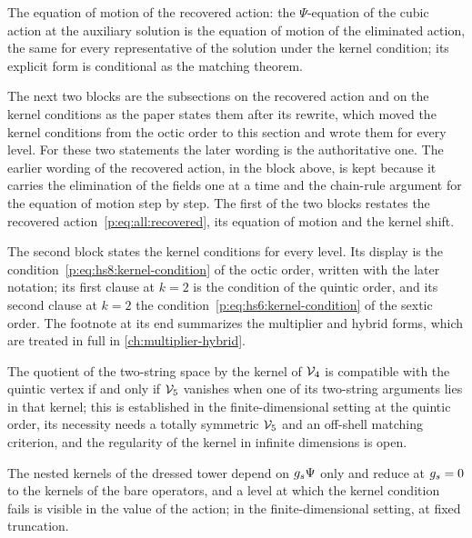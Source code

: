 \noindent{} The equation of motion of the recovered action: the $\Psi$-equation of the cubic action at the auxiliary solution is the equation of motion of the eliminated action, the same for every representative of the solution under the kernel condition; its explicit form is conditional as the matching theorem.



\medskip
The next two blocks are the subsections on the recovered action and on the kernel conditions as the paper states them after its rewrite, which moved the kernel conditions from the octic order to this section and wrote them for every level.
For these two statements the later wording is the authoritative one.
The earlier wording of the recovered action, in the block above, is kept because it carries the elimination of the fields one at a time and the chain-rule argument for the equation of motion step by step.
The first of the two blocks restates the recovered action~\eqref{p:eq:all:recovered}, its equation of motion and the kernel shift.



\medskip
The second block states the kernel conditions for every level.
Its display is the condition~\eqref{p:eq:hs8:kernel-condition} of the octic order, written with the later notation; its first clause at $k = 2$ is the condition of the quintic order, and its second clause at $k = 2$ the condition~\eqref{p:eq:hs6:kernel-condition} of the sextic order.
The footnote at its end summarizes the multiplier and hybrid forms, which are treated in full in \cref{ch:multiplier-hybrid}.

\noindent{} The quotient of the two-string space by the kernel of $\mathcal{V}_{4}$ is compatible with the quintic vertex if and only if $\mathcal{V}_{5}$ vanishes when one of its two-string arguments lies in that kernel; this is established in the finite-dimensional setting at the quintic order, its necessity needs a totally symmetric $\mathcal{V}_{5}$ and an off-shell matching criterion, and the regularity of the kernel in infinite dimensions is open.

\noindent{} The nested kernels of the dressed tower depend on $g_s \Psi$ only and reduce at $g_s = 0$ to the kernels of the bare operators, and a level at which the kernel condition fails is visible in the value of the action; in the finite-dimensional setting, at fixed truncation.

